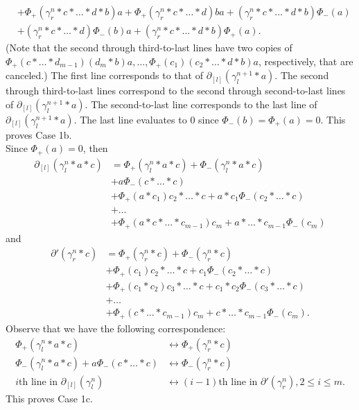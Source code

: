\documentclass[11pt]{amsart}
\makeatletter
\renewenvironment{proof}[1][\proofname] {\par\pushQED{\qed}{\normalfont\bfseries\topsep6\p@\@plus6\p@\relax #1\@addpunct{.} }}{\popQED\endtrivlist\@endpefalse}
\theoremstyle{mystyle}
\newcommand{\<}{\langle}
\renewcommand{\>}{\rangle}
\makeatother
\begin{document}
\begin{proof}
\begin{align*}
        &+ \Phi_+(\gamma_r^n * c * \dots * d * b)a + \Phi_+(\gamma_r^n * c * \dots * d) ba + (\gamma_r^n * c * \dots * d * b) \Phi_-(a) \\
        &+ (\gamma_r^n * c * \dots * d) \Phi_-(b) a + (\gamma_r^n * c * \dots * d * b) \Phi_+(a).
    \end{align*} (Note that the second through third-to-last lines have two copies of $\Phi_+(c * \dots * d_{m-1}) (d_m * b) a, \dots, \Phi_+(c_1)(c_2 * \dots * d * b)a$, respectively, that are canceled.) The first line corresponds to that of $\partial_{[l]}(\gamma_l^{n+1} * a)$. The second through third-to-last lines correspond to the second through second-to-last lines of $\partial_{[l]}(\gamma_l^{n+1} * a)$. The second-to-last line corresponds to the last line of $\partial_{[l]}(\gamma_l^{n+1} * a)$. The last line evaluates to $0$ since $\Phi_-(b) = \Phi_+(a) = 0$. This proves Case 1b. \\

     Since $\Phi_+(a) = 0$, then \begin{align*}
        \partial_{[l]} (\gamma_l^n * a * c) &= \Phi_+(\gamma_l^n * a * c) + \Phi_-(\gamma_l^n * a * c) \\ 
        &+ a \Phi_-(c * \dots  * c) \\
        &+ \Phi_+(a * c_1) c_2 * \dots  * c + a * c_1 \Phi_-(c_2 * \dots  * c) \\
        &+ \ldots \\
        &+ \Phi_+(a * c * \dots  * c_{m-1}) c_m + a * \dots  * c_{m-1} \Phi_-(c_m)
    \end{align*} and \begin{align*}
        \partial' (\gamma_r^n * c) &= \Phi_+(\gamma_r^n * c) + \Phi_-(\gamma_r^n * c) \\
        &+ \Phi_+(c_1) c_2 * \dots  * c + c_1 \Phi_-(c_2 * \dots  * c) \\
        &+ \Phi_+(c_1 * c_2) c_3 * \dots  * c + c_1 * c_2 \Phi_-(c_3 * \dots  * c) \\
        &+ \ldots \\
        &+ \Phi_+(c * \dots  * c_{m-1}) c_m + c * \dots  * c_{m-1} \Phi_-(c_m).
    \end{align*} Observe that we have the following correspondence:
    \begin{align*}
        \Phi_+(\gamma_l^n * a * c) &\leftrightarrow \Phi_+(\gamma_r^n * c) \\
        \Phi_-(\gamma_l^n * a * c) + a \Phi_-(c * \dots  * c) &\leftrightarrow \Phi_-(\gamma_r^n * c) \\
        i\text{th line in } \partial_{[l]}(\gamma_l^n) &\leftrightarrow (i-1)\text{th line in } \partial'(\gamma_r^n), 2 \leq i \leq m.
    \end{align*} This proves Case 1c. \\


\end{proof}
\end{document}
